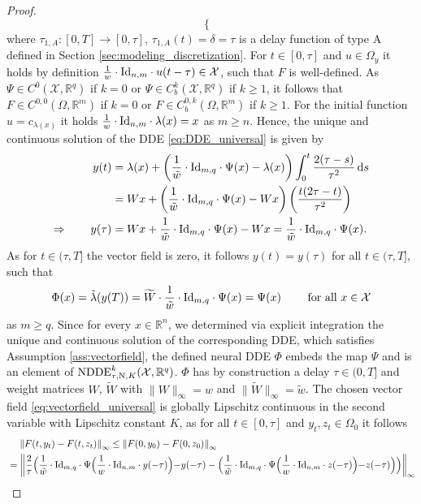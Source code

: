 \documentclass[10pt]{article}
\numberwithin{equation}{section}
\newcommand*{\dd}{\mathrm{d}}
\newcommand\norm[1]{\left\lVert#1\right\rVert}
\newcommand\normm[1]{\big\lVert#1\big\lVert}
\begin{document}
\begin{proof}
\begin{equation}
\begin{cases}
			\end{cases}
		\end{equation}
		where $\tau_{1,A}:[0,T]\rightarrow [0,\tau]$, $\tau_{1,A}(t) = \delta =  \tau$ is a delay function of type A defined in Section \ref{sec:modeling_discretization}. For $t \in [0,\tau]$ and $u \in \Omega_y$ it holds by definition $ \frac{1}{w}\cdot \textup{Id}_{n,m} \cdot  u(t-\tau) \in \mathcal{X}$, such that $F$ is well-defined. As $\Psi\in C^0(\mathcal{X}, \mathbb{R}^q)$ if $k = 0$ or $\Psi\in C^k_b(\mathcal{X},\mathbb{R}^q)$ if $k\geq 1$, it follows that $F \in C^{0,0}(\Omega,\mathbb{R}^m)$ if $k = 0$ or $F\in C_b^{0,k}(\Omega,\mathbb{R}^m)$ if $k\geq 1$.  For the initial function $u = c_{\lambda(x)}$ it holds $\frac{1}{w}\cdot \textup{Id}_{n,m} \cdot \lambda(x) = x$ as $m\geq n$. Hence, the unique and continuous solution of the  DDE \eqref{eq:DDE_universal} is given by
		\begin{align*}
			y(t) &= \lambda(x)+ \left(\frac{1}{\tilde w}\cdot \textup{Id}_{m,q}\cdot \Psi(x)-\lambda(x)\right) \int_0^t \frac{2(\tau-s)}{\tau^2}  \, \dd s \\
			&= Wx + \left(\frac{1}{\tilde w}\cdot\textup{Id}_{m,q}\cdot\Psi(x)-Wx\right)\left(\frac{t(2\tau-t)}{\tau^2}\right) \\		
			\Rightarrow \qquad  y(\tau) &= Wx+ \frac{1}{\tilde w}\cdot \textup{Id}_{m,q}\cdot \Psi(x)-Wx = \frac{1}{\tilde w}\cdot \textup{Id}_{m,q}\cdot \Psi(x).
		\end{align*}
		As for $t \in (\tau,T]$ the vector field is zero, it follows $y(t) = y(\tau)$ for all $t\in(\tau,T]$, such that $$\Phi(x) = \tilde \lambda (y(T)) = \widetilde{W}\cdot \frac{1}{\tilde w}\cdot \textup{Id}_{m,q}\cdot \Psi(x) = \Psi(x) \qquad \text{ for all } x \in \mathcal{X}$$ as $m\geq q$. Since for every $x \in \mathbb{R}^n$, we determined via explicit integration the unique and continuous solution of the corresponding DDE, which satisfies Assumption \ref{ass:vectorfield}, the defined neural DDE $\Phi$ embeds the map $\Psi$ and is an element of $\textup{NDDE}^k_{\tau,\textup{N},K}(\mathcal{X},\mathbb{R}^q)$. $\Phi$ has by construction a delay $\tau\in(0,T]$ and weight matrices $W$, $\widetilde{W}$ with $\normm{W}_\infty = w$ and $\normm{\widetilde{W}}_\infty = \tilde w$. The chosen vector field \eqref{eq:vectorfield_universal} is globally Lipschitz continuous in the second variable with Lipschitz constant $K$, as for all $t \in [0,\tau]$ and $y_t,z_t \in \Omega_0$ it follows
		\begin{align*}
			&\hspace{4mm}\norm{F(t,y_t)-F(t,z_t)}_\infty  \leq 	\norm{F(0,y_0)-F(0,z_0)}_\infty \\ & = \norm{\frac{2}{\tau}\Bigl(\frac{1}{\tilde w}\cdot\textup{Id}_{m,q}\cdot \Psi\Bigl(\frac{1}{w}\cdot \textup{Id}_{n,m}\cdot y(-\tau)\Bigl)-y(-\tau) -\Bigl(\frac{1}{\tilde w}\cdot\textup{Id}_{m,q}\cdot\Psi\Bigl(\frac{1}{w}\cdot\textup{Id}_{n,m}\cdot z(-\tau)\Bigl)-z(-\tau)\Bigl)\Bigl)}_\infty \\

\end{align*}
\end{proof}
\end{document}

